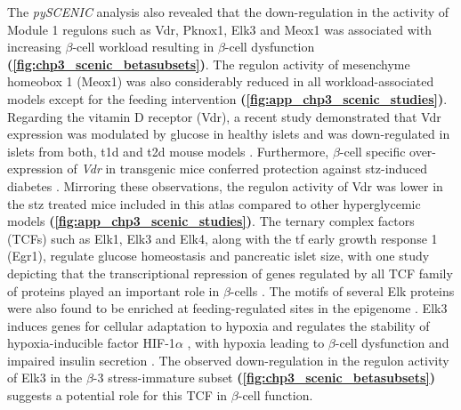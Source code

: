 \par The \textit{pySCENIC} analysis also revealed that the down-regulation in the activity of Module 1 regulons such as Vdr, Pknox1, Elk3 and Meox1 was associated with increasing $\beta$-cell workload resulting in $\beta$-cell dysfunction \textbf{(\autoref{fig:chp3_scenic_betasubsets})}. The regulon activity of mesenchyme homeobox 1 (Meox1) was also considerably reduced in all workload-associated models except for the feeding intervention \textbf{(\autoref{fig:app_chp3_scenic_studies})}. Regarding the vitamin D receptor (Vdr), a recent study demonstrated that Vdr expression was modulated by glucose in healthy islets and was down-regulated in islets from both, \gls{t1d} and \gls{t2d} mouse models \textbf{\cite{morro_vitamin_2020}}. Furthermore, $\beta$-cell specific over-expression of \textit{Vdr} in transgenic mice conferred protection against \gls{stz}-induced diabetes \textbf{\cite{morro_vitamin_2020}}. Mirroring these observations, the regulon activity of Vdr was lower in the \gls{stz} treated mice included in this atlas compared to other hyperglycemic models \textbf{(\autoref{fig:app_chp3_scenic_studies})}. The ternary complex factors (TCFs) such as Elk1, Elk3 and Elk4, along with the \gls{tf} early growth response 1 (Egr1), regulate glucose homeostasis and pancreatic islet size, with one study depicting that the transcriptional repression of genes regulated by all TCF family of proteins played an important role in $\beta$-cells \textbf{\cite{lesch_ternary_2020}}. The motifs of several Elk proteins were also found to be enriched at feeding-regulated sites in the epigenome \textbf{\cite{wortham_nutrient_2023}}. Elk3 induces genes for cellular adaptation to hypoxia and regulates the stability of hypoxia-inducible factor HIF-1$\alpha$ \textbf{\cite{gross_ternary_2007,gross_ternary_2008}}, with hypoxia leading to $\beta$-cell dysfunction and impaired insulin secretion \textbf{\cite{tsuyama_hypoxia_2023}}. The observed down-regulation in the regulon activity of Elk3 in the $\beta$-3 stress-immature subset \textbf{(\autoref{fig:chp3_scenic_betasubsets})} suggests a potential role for this TCF in $\beta$-cell function.\\







